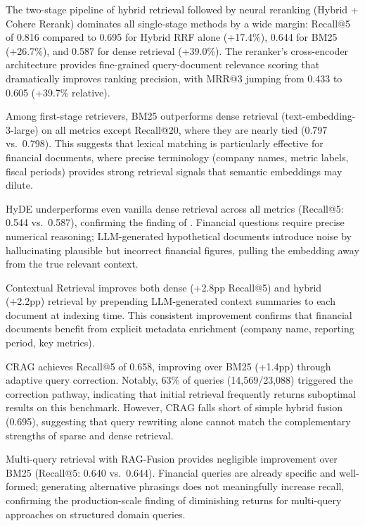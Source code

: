 \documentclass[11pt]{article}
\begin{document}
The two-stage pipeline of hybrid retrieval followed by neural reranking (Hybrid + Cohere Rerank) dominates all single-stage methods by a wide margin: Recall@5 of 0.816 compared to 0.695 for Hybrid RRF alone (+17.4\%), 0.644 for BM25 (+26.7\%), and 0.587 for dense retrieval (+39.0\%). The reranker's cross-encoder architecture provides fine-grained query-document relevance scoring that dramatically improves ranking precision, with MRR@3 jumping from 0.433 to 0.605 (+39.7\% relative).

Among first-stage retrievers, BM25 outperforms dense retrieval (text-embedding-3-large) on all metrics except Recall@20, where they are nearly tied (0.797 vs.\ 0.798). This suggests that lexical matching is particularly effective for financial documents, where precise terminology (company names, metric labels, fiscal periods) provides strong retrieval signals that semantic embeddings may dilute.

HyDE underperforms even vanilla dense retrieval across all metrics (Recall@5: 0.544 vs.\ 0.587), confirming the finding of \citet{strich2026t2ragbench}. Financial questions require precise numerical reasoning; LLM-generated hypothetical documents introduce noise by hallucinating plausible but incorrect financial figures, pulling the embedding away from the true relevant context.

Contextual Retrieval \citep{anthropic2024contextual} improves both dense (+2.8pp Recall@5) and hybrid (+2.2pp) retrieval by prepending LLM-generated context summaries to each document at indexing time. This consistent improvement confirms that financial documents benefit from explicit metadata enrichment (company name, reporting period, key metrics).

CRAG achieves Recall@5 of 0.658, improving over BM25 (+1.4pp) through adaptive query correction. Notably, 63\% of queries (14,569/23,088) triggered the correction pathway, indicating that initial retrieval frequently returns suboptimal results on this benchmark. However, CRAG falls short of simple hybrid fusion (0.695), suggesting that query rewriting alone cannot match the complementary strengths of sparse and dense retrieval.

Multi-query retrieval with RAG-Fusion \citep{raudaschl2023ragfusion} provides negligible improvement over BM25 (Recall@5: 0.640 vs.\ 0.644). Financial queries are already specific and well-formed; generating alternative phrasings does not meaningfully increase recall, confirming the production-scale finding of diminishing returns for multi-query approaches on structured domain queries.
\end{document}
